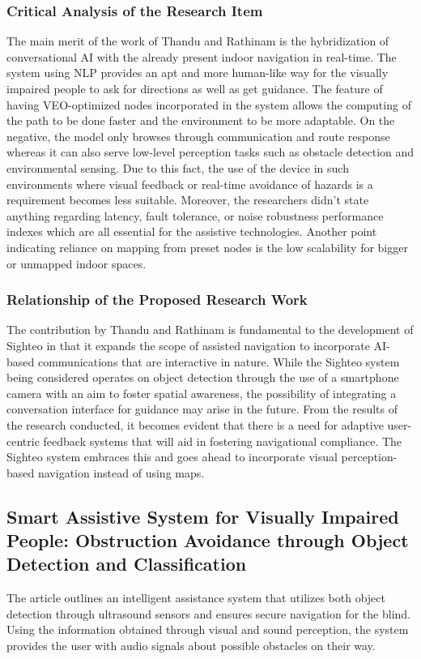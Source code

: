 \documentclass{FastFyp}
\begin{document}
\subsubsection{Critical Analysis of the Research Item}
The main merit of the work of Thandu and Rathinam is the hybridization of conversational AI with the already present indoor navigation in real-time. The system using NLP provides an apt and more human-like way for the visually impaired people to ask for directions as well as get guidance. The feature of having VEO-optimized nodes incorporated in the system allows the computing of the path to be done faster and the environment to be more adaptable. On the negative, the model only browses through communication and route response whereas it can also serve low-level perception tasks such as obstacle detection and environmental sensing. Due to this fact, the use of the device in such environments where visual feedback or real-time avoidance of hazards is a requirement becomes less suitable. Moreover, the researchers didn't state anything regarding latency, fault tolerance, or noise robustness performance indexes which are all essential for the assistive technologies. Another point indicating reliance on mapping from preset nodes is the low scalability for bigger or unmapped indoor spaces.

\subsubsection{Relationship of the Proposed Research Work}
The contribution by Thandu and Rathinam \cite{ref:thandu2024enhancing} is fundamental to the development of Sighteo in that it expands the scope of assisted navigation to incorporate AI-based communications that are interactive in nature. While the Sighteo system being considered operates on object detection through the use of a smartphone camera with an aim to foster spatial awareness, the possibility of integrating a conversation interface for guidance may arise in the future. From the results of the research conducted, it becomes evident that there is a need for adaptive user-centric feedback systems that will aid in fostering navigational compliance. The Sighteo system embraces this and goes ahead to incorporate visual perception-based navigation instead of using maps.

\subsection{Smart Assistive System for Visually Impaired People: Obstruction Avoidance through Object Detection and Classification}
The article outlines an intelligent assistance system that utilizes both object detection through ultrasound sensors and ensures secure navigation for the blind. Using the information obtained through visual and sound perception, the system provides the user with audio signals about possible obstacles on their way.
\end{document}
